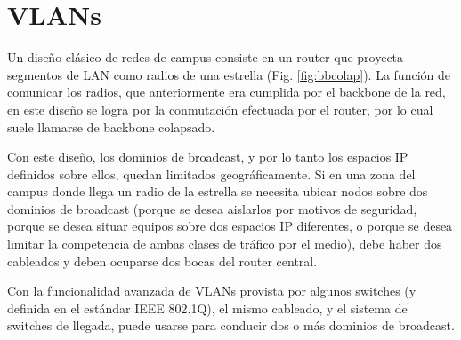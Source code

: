 

\section{VLANs}
Un diseño clásico de redes de campus consiste en un router que proyecta segmentos de LAN como radios de una estrella (Fig. \ref{fig:bbcolap}). La función de comunicar los radios, que anteriormente era cumplida por el backbone de la red, en este diseño se logra por la conmutación efectuada por el router, por lo cual suele llamarse de backbone colapsado. 

Con este diseño, los dominios de broadcast, y por lo tanto los espacios IP definidos sobre ellos, quedan limitados geográficamente. Si en una zona del campus donde llega un radio de la estrella se necesita ubicar nodos sobre dos dominios de broadcast (porque se desea aislarlos por motivos de seguridad, porque se desea situar equipos sobre dos espacios IP diferentes, o porque se desea limitar la competencia de ambas clases de tráfico por el medio), debe haber dos cableados y deben ocuparse dos bocas del router central. 




Con la funcionalidad avanzada de VLANs provista por algunos switches (y definida en el estándar IEEE 802.1Q), el mismo cableado, y el sistema de switches de llegada, puede usarse para conducir dos o más dominios de broadcast. 
 
